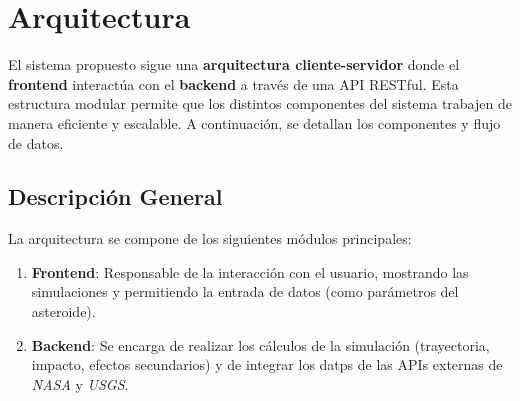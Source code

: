 \documentclass[conference]{IEEEtran}
\begin{document}
\section{Arquitectura}
El sistema propuesto sigue una \textbf{arquitectura cliente-servidor} donde
el \textbf{frontend} interactúa con el \textbf{backend} a través de una API RESTful.
Esta estructura modular permite que los distintos componentes del sistema trabajen
de manera eficiente y escalable. A continuación, se detallan los componentes y
flujo de datos.
\subsection{Descripción General}
La arquitectura se compone de los siguientes módulos principales:
\begin{enumerate}
	\item \textbf{Frontend}: Responsable de la interacción con el usuario,
	      mostrando las simulaciones y permitiendo la entrada de datos (como parámetros del asteroide).
	\item \textbf{Backend}: Se encarga de realizar los cálculos de la simulación
	      (trayectoria, impacto, efectos secundarios) y de integrar los datps de las
	      APIs externas de \textit{NASA} y \textit{USGS}.
\end{enumerate}
\end{document}
